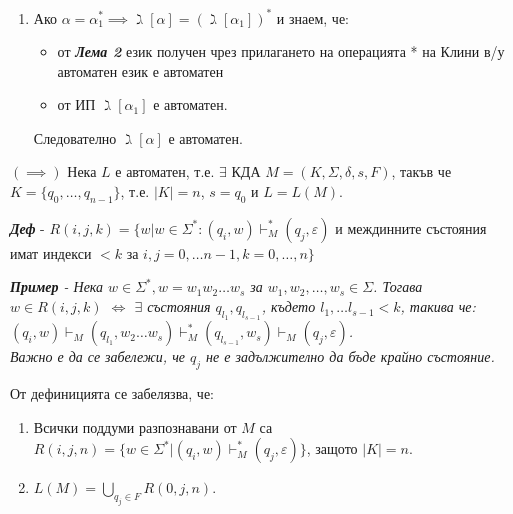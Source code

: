 \documentclass[fleqn,12pt]{article}
\begin{document}
\begin{flushleft}
\begin{enumerate}
    \item Ако $\alpha = \alpha_1^* \implies \gimel[\alpha] = (\gimel[\alpha_1])^*$ и знаем, че:
    \begin{itemize}
        \item от \textit{\textbf{Лема 2}} език получен чрез прилагането на операцията * на Клини в/у автоматен език е автоматен
        \item от ИП $\gimel[\alpha_1]$ е автоматен.
    \end{itemize}
    Следователно $\gimel[\alpha]$ е автоматен.
\end{enumerate}

$(\implies)$ Нека $L$ е автоматен, т.е. $\exists$ КДА $M = (K, \Sigma, \delta, s, F)$, такъв че $K = \{q_0, \dots, q_{n-1}\}$, т.е. $|K| = n$, $s=q_0$ и $L = L(M)$. 

\textit{\textbf{Деф}} - $R(i, j, k) = \{w | w \in \Sigma^*: (q_i, w) \vdash_M^* (q_j, \varepsilon)$ и междинните състояния имат индекси $< k$ за $ i, j = 0, \dots n-1, k = 0, \dots, n\}$

\textit{\textbf{Пример} - Нека $w \in \Sigma^*, w = w_1w_2{\dots}w_s$ за $w_1, w_2, \dots, w_s \in \Sigma$. Тогава $w \in R(i, j, k)$ $\iff$ $\exists$ състояния $q_{l_1}, q_{l_{s-1}}$, където $l_1, \dots l_{s-1} < k$, такива че: \\ $(q_i, w) \vdash_M (q_{l_1}, w_2{\dots}w_s) \vdash_M^* (q_{l_{s-1}}, w_s) \vdash_M (q_j, \varepsilon)$. \\Важно е да се забележи, че $q_j$ не е задължително да бъде крайно състояние.}

От дефиницията се забелязва, че:
\begin{enumerate}
    \item Всички поддуми разпознавани от $M$ са $R(i, j, n) = \{w \in \Sigma^* | (q_i,w) \vdash_M^* (q_j, \varepsilon)\}$, защото $|K| = n$.
    \item $L(M) = \bigcup\limits_{q_j \in F} R(0, j, n)$.
\end{enumerate}


\end{flushleft}
\end{document}
